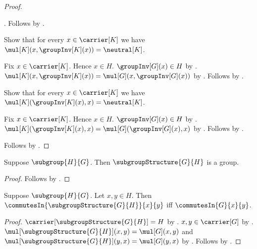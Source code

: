 \begin{proof}
\begin{subproof}
            .
        Follows by
            .
    \end{subproof}
    Show that for every $x\in\carrier[K]$ we have
        $\mul[K](x,\groupInv[K](x))=\neutral[K]$.
    \begin{subproof}
        Fix $x\in\carrier[K]$.
        Hence $x\in H$.
        $\groupInv[G](x)\in H$ by .
        $\mul[K](x,\groupInv[K](x))
            =\mul[G](x,\groupInv[G](x))$ by
            .
        Follows by
            .
    \end{subproof}
    Show that for every $x\in\carrier[K]$ we have
        $\mul[K](\groupInv[K](x),x)=\neutral[K]$.
    \begin{subproof}
        Fix $x\in\carrier[K]$.
        Hence $x\in H$.
        $\groupInv[G](x)\in H$ by .
        $\mul[K](\groupInv[K](x),x)
            =\mul[G](\groupInv[G](x),x)$ by
            .
        Follows by
            .
    \end{subproof}
    Follows by
        .
\end{proof}

\begin{corollary}\label{subgroup_structure_is_group}
    Suppose $\subgroup{H}{G}$.
    Then $\subgroupStructure{G}{H}$ is a group.
\end{corollary}
\begin{proof}
    Follows by .
\end{proof}

\begin{theorem}\label{subgroup_structure_commutes_iff}
    Suppose $\subgroup{H}{G}$.
    Let $x,y\in H$.
    Then
        $\commutesIn{\subgroupStructure{G}{H}}{x}{y}$ iff
        $\commutesIn{G}{x}{y}$.
\end{theorem}
\begin{proof}
    $\carrier[\subgroupStructure{G}{H}]=H$ by
        .
    $x,y\in\carrier[G]$ by .
    $\mul[\subgroupStructure{G}{H}](x,y)=\mul[G](x,y)$ and
        $\mul[\subgroupStructure{G}{H}](y,x)=\mul[G](y,x)$ by
        .
    Follows by .
\end{proof}

